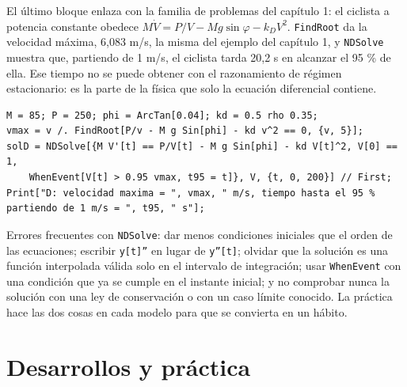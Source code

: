 \documentclass[10pt,openany]{book}
\begin{document}
El último bloque enlaza con la familia de problemas del capítulo 1: el ciclista a potencia constante obedece \(M\dot V = P/V - Mg\sin\varphi - k_D V^{2}\). \texttt{FindRoot} da la velocidad máxima, 6,083 m/s, la misma del ejemplo del capítulo 1, y \texttt{NDSolve} muestra que, partiendo de 1 m/s, el ciclista tarda 20,2 s en alcanzar el 95 \% de ella. Ese tiempo no se puede obtener con el razonamiento de régimen estacionario: es la parte de la física que solo la ecuación diferencial contiene.
\begin{lstlisting}[style=studium]
M = 85; P = 250; phi = ArcTan[0.04]; kd = 0.5 rho 0.35;
vmax = v /. FindRoot[P/v - M g Sin[phi] - kd v^2 == 0, {v, 5}];
solD = NDSolve[{M V'[t] == P/V[t] - M g Sin[phi] - kd V[t]^2, V[0] == 1,
    WhenEvent[V[t] > 0.95 vmax, t95 = t]}, V, {t, 0, 200}] // First;
Print["D: velocidad maxima = ", vmax, " m/s, tiempo hasta el 95 % partiendo de 1 m/s = ", t95, " s"];
\end{lstlisting}

\begin{tcolorbox}[title={Consejo}, studiumtip, breakable]

Errores frecuentes con \texttt{NDSolve}: dar menos condiciones iniciales que el orden de las ecuaciones; escribir \texttt{y[t]''} en lugar de \texttt{y''[t]}; olvidar que la solución es una función interpolada válida solo en el intervalo de integración; usar \texttt{WhenEvent} con una condición que ya se cumple en el instante inicial; y no comprobar nunca la solución con una ley de conservación o con un caso límite conocido. La práctica hace las dos cosas en cada modelo para que se convierta en un hábito.
\end{tcolorbox}



\section{Desarrollos y práctica}
\end{document}
